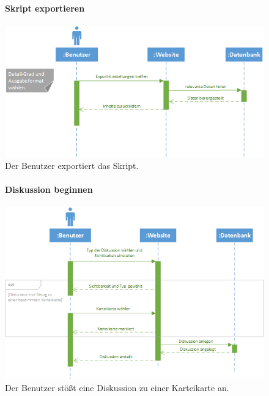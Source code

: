 \documentclass[12pt,a4paper]{article}
\begin{document}
\begin{figure}[H]
	\centering
	\paragraph{Skript exportieren}
	\includegraphics[width=\textwidth]{Bilder/Sequenzdiagramme/SkriptExportieren.png}
	\caption{Der Benutzer exportiert das Skript.}
	\label{SzSkriptExportieren}
\end{figure}
\begin{figure}[H]
	\centering
	\paragraph{Diskussion beginnen}
	\includegraphics[width=\textwidth]{Bilder/Sequenzdiagramme/DiskussionAnstossen.png}
	\caption{Der Benutzer stößt eine Diskussion zu einer Karteikarte an.}
	\label{SzDiskussionAnstossen}
\end{figure}
\end{document}
